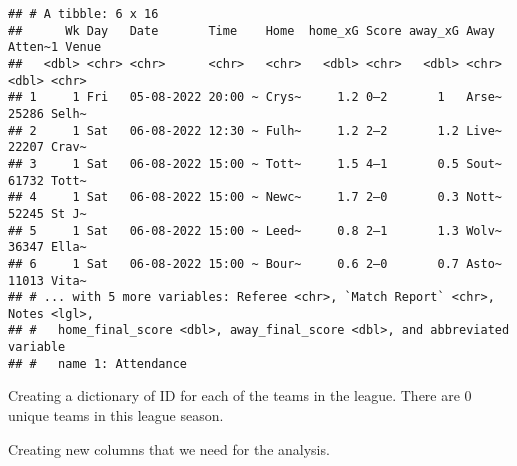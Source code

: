 \documentclass[
]{article}
\newenvironment{Shaded}{\begin{snugshade}}{\end{snugshade}}
\newcommand{\AttributeTok}[1]{\textcolor[rgb]{0.77,0.63,0.00}{#1}}
\newcommand{\CommentTok}[1]{\textcolor[rgb]{0.56,0.35,0.01}{\textit{#1}}}
\newcommand{\DecValTok}[1]{\textcolor[rgb]{0.00,0.00,0.81}{#1}}
\newcommand{\FunctionTok}[1]{\textcolor[rgb]{0.00,0.00,0.00}{#1}}
\newcommand{\NormalTok}[1]{#1}
\newcommand{\OtherTok}[1]{\textcolor[rgb]{0.56,0.35,0.01}{#1}}
\newcommand{\SpecialCharTok}[1]{\textcolor[rgb]{0.00,0.00,0.00}{#1}}
\begin{document}
\begin{verbatim}
## # A tibble: 6 x 16
##      Wk Day   Date       Time    Home  home_xG Score away_xG Away  Atten~1 Venue
##   <dbl> <chr> <chr>      <chr>   <chr>   <dbl> <chr>   <dbl> <chr>   <dbl> <chr>
## 1     1 Fri   05-08-2022 20:00 ~ Crys~     1.2 0–2       1   Arse~   25286 Selh~
## 2     1 Sat   06-08-2022 12:30 ~ Fulh~     1.2 2–2       1.2 Live~   22207 Crav~
## 3     1 Sat   06-08-2022 15:00 ~ Tott~     1.5 4–1       0.5 Sout~   61732 Tott~
## 4     1 Sat   06-08-2022 15:00 ~ Newc~     1.7 2–0       0.3 Nott~   52245 St J~
## 5     1 Sat   06-08-2022 15:00 ~ Leed~     0.8 2–1       1.3 Wolv~   36347 Ella~
## 6     1 Sat   06-08-2022 15:00 ~ Bour~     0.6 2–0       0.7 Asto~   11013 Vita~
## # ... with 5 more variables: Referee <chr>, `Match Report` <chr>, Notes <lgl>,
## #   home_final_score <dbl>, away_final_score <dbl>, and abbreviated variable
## #   name 1: Attendance
\end{verbatim}

Creating a dictionary of ID for each of the teams in the league. There
are 0 unique teams in this league season.

\begin{Shaded}
\end{Shaded}

Creating new columns that we need for the analysis.
\end{document}
